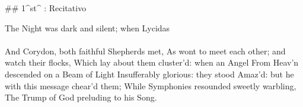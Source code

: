 ## 1^st^ \mvmt: Recitativo

\beginnumbering
\pstart
The Night was dark and silent; when Lycidas \\\\
And Corydon, both faithful Shepherds met,
As wont to meet each other; and watch their flocks,
Which lay about them cluster’d: when an Angel
From Heav’n descended on a Beam of Light
Insufferably glorious: they stood
Amaz’d: but he with this message chear’d them;
While Symphonies resounded sweetly warbling,
The Trump of God preluding to his Song.
\pend
\endnumbering
